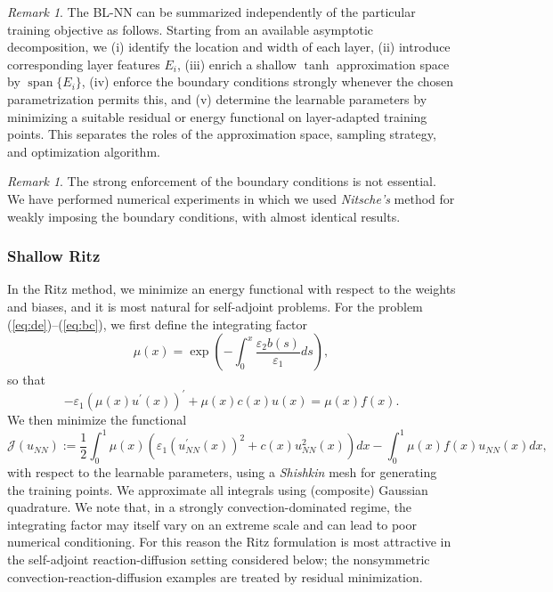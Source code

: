 \documentclass[11pt]{article}
\providecommand{\e}{\varepsilon}
\theoremstyle{plain}
\theoremstyle{definition}
\theoremstyle{remark}
\newtheorem{remark}[theorem]{Remark}
\numberwithin{equation}{section}
\begin{document}
\begin{remark}
The BL-NN can be summarized independently of the particular training objective as follows. Starting from an available asymptotic decomposition, we (i) identify the location and width of each layer, (ii) introduce corresponding layer features $E_i$, (iii) enrich a shallow $\tanh$ approximation space by $\operatorname{span}\{E_i\}$, (iv) enforce the boundary conditions strongly whenever the chosen parametrization permits this, and (v) determine the learnable parameters by minimizing a suitable residual or energy functional on layer-adapted training points. This separates the roles of the approximation space, sampling strategy, and optimization algorithm.
\end{remark}

\begin{remark}
The strong enforcement of the boundary conditions is not essential. We have performed numerical experiments in which we used \emph{Nitsche's} method \cite{Nitsche} for weakly imposing the boundary conditions, with almost identical results.
\end{remark}


\subsubsection{Shallow Ritz}
\label{shallowritz}
In the Ritz method, we minimize an energy functional with respect to the weights and biases, and it is most natural for self-adjoint problems. 
%
For the problem (\ref{eq:de})--(\ref{eq:bc}), we first define the integrating factor
$$
\mu(x)=\exp \left(-\int_0^x \frac{\varepsilon_2 b(s)}{\varepsilon_1} d s\right),
$$
so that 
$$
-\varepsilon_1\left(\mu(x) u^{\prime}(x)\right)^{\prime}+\mu(x) c(x) u(x)=\mu(x) f(x) .
$$
We then minimize the functional
%
$$
\mathcal{J}(u_{NN}):= \frac{1}{2} \int_0^1 \mu(x) \left(\e_1 (u_{NN}^{\prime}(x))^2+c(x) u_{NN}^2(x)\right)dx -\int_0^1 \mu(x) f(x) u_{NN}(x) dx, 
$$
%
with respect to the learnable parameters, using a \emph{Shishkin} mesh \cite{Shishkin2} for generating the training points. We approximate all integrals using (composite) Gaussian quadrature. We note that, in a strongly convection-dominated regime, the integrating factor may itself vary on an extreme scale and can lead to poor numerical conditioning. For this reason the Ritz formulation is most attractive in the self-adjoint reaction-diffusion setting considered below; the nonsymmetric convection-reaction-diffusion examples are treated by residual minimization.
\end{document}
